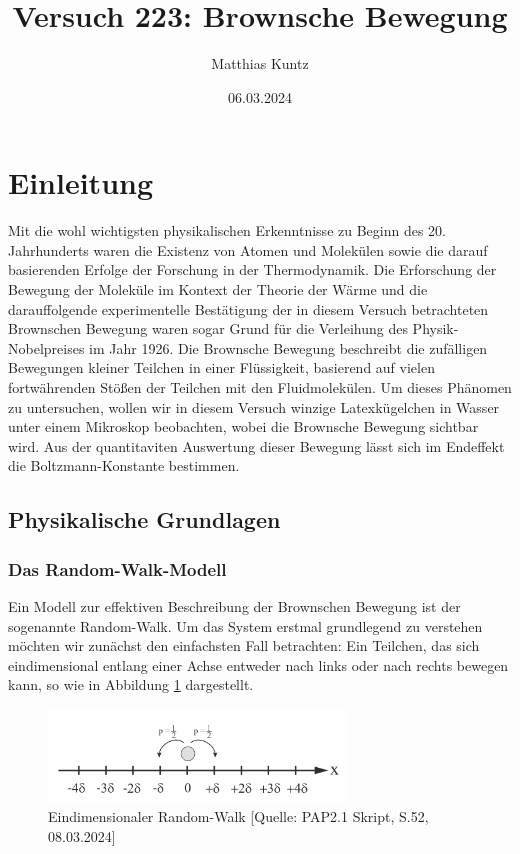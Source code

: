 \documentclass{article}
\title{Versuch 223: Brownsche Bewegung}
\author{Matthias Kuntz}
\date{06.03.2024}
\begin{document}
\maketitle

\tableofcontents

\newpage

\section{Einleitung}

Mit die wohl wichtigsten physikalischen Erkenntnisse zu Beginn des 20. Jahrhunderts waren die Existenz von Atomen und Molekülen sowie die darauf basierenden Erfolge der Forschung in der Thermodynamik. Die Erforschung der Bewegung der Moleküle im Kontext der Theorie der Wärme und die darauffolgende experimentelle Bestätigung der in diesem Versuch betrachteten Brownschen Bewegung waren sogar Grund für die Verleihung des Physik-Nobelpreises im Jahr 1926. Die Brownsche Bewegung beschreibt die zufälligen Bewegungen kleiner Teilchen in einer Flüssigkeit, basierend auf vielen fortwährenden Stößen der Teilchen mit den Fluidmolekülen. Um dieses Phänomen zu untersuchen, wollen wir in diesem Versuch winzige Latexkügelchen in Wasser unter einem Mikroskop beobachten, wobei die Brownsche Bewegung sichtbar wird. Aus der quantitaviten Auswertung dieser Bewegung lässt sich im Endeffekt die Boltzmann-Konstante bestimmen.


\subsection{Physikalische Grundlagen}

\subsubsection{Das Random-Walk-Modell}

Ein Modell zur effektiven Beschreibung der Brownschen Bewegung ist der sogenannte Random-Walk. Um das System erstmal grundlegend zu verstehen möchten wir zunächst den einfachsten Fall betrachten: Ein Teilchen, das sich eindimensional entlang einer Achse entweder nach links oder nach rechts bewegen kann, so wie in Abbildung \ref{fig:randomwalk} dargestellt.

\begin{figure}[!h]
    \centering
    \includegraphics[width=0.7\textwidth]{graphics/randomwalk.png}
    \caption{Eindimensionaler Random-Walk [Quelle: PAP2.1 Skript, S.52, 08.03.2024]}
    \label{fig:randomwalk}
\end{figure}
\end{document}
